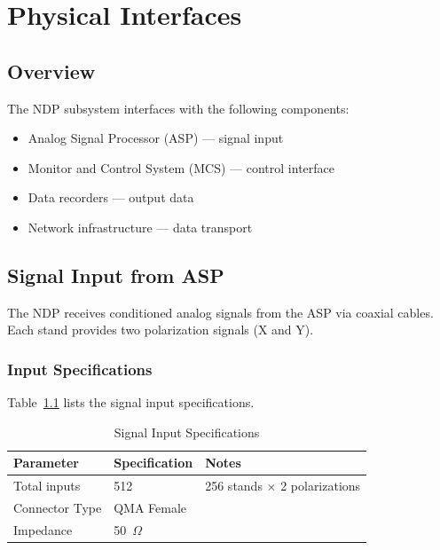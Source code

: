 
\chapter{Physical Interfaces}
\label{sec:physical}

\section{Overview}

The NDP subsystem interfaces with the following components:
\begin{itemize}
    \item Analog Signal Processor (ASP) --- signal input
    \item Monitor and Control System (MCS) --- control interface
    \item Data recorders --- output data
    \item Network infrastructure --- data transport
\end{itemize}

\section{Signal Input from ASP}

The NDP receives conditioned analog signals from the ASP via coaxial cables. Each stand provides two polarization signals (X and Y).

\subsection{Input Specifications}

Table~\ref{tab:input-specs} lists the signal input specifications.

\begin{table}[htbp]
    \centering
    \caption{Signal Input Specifications}
    \label{tab:input-specs}
    \begin{tabular}{lll}
        \toprule
        \textbf{Parameter} & \textbf{Specification} & \textbf{Notes} \\
        \midrule
        Total inputs & 512 & 256 stands $\times$ 2 polarizations \\
        Connector Type & QMA Female & \\
        Impedance & 50~$\Omega$ & \\
        \bottomrule
    \end{tabular}
\end{table}

